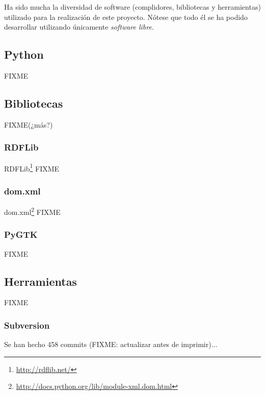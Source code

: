 Ha sido mucha la diversidad de software (complidores, bibliotecas y herramientas)
utilizado para la realización de este proyecto. Nótese que todo él se ha podido
desarrollar utilizando únicamente \emph{software libre}.

\subsection{Python}

FIXME

\subsection{Bibliotecas\label{sec:conclu:bib}}

FIXME(¿más?)

\subsubsection{RDFLib}

RDFLib\footnote{\url{http://rdflib.net/}} FIXME

\subsubsection{dom.xml}

dom.xml\footnote{\url{http://docs.python.org/lib/module-xml.dom.html}} FIXME

\subsubsection{PyGTK}

FIXME

\subsection{Herramientas}

FIXME

\subsubsection{Subversion}

Se han hecho 458 commits (FIXME: actualizar antes de imprimir)...

